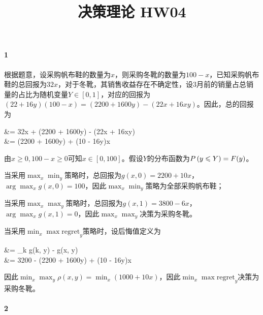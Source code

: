 \documentclass{../notes}
\title{决策理论 HW04}
\begin{document}
    \maketitle

    \paragraph*{1}

    根据题意，设采购帆布鞋的数量为$x$，则采购冬靴的数量为$100-x$，已知采购帆布鞋的总回报为$32x$，对于冬靴，其销售收益存在不确定性，设3月前的销量占总销量的占比为随机变量$Y\in [0, 1]$，对应的回报为$(22 + 16y)(100 - x) = (2200 + 1600y) - (22x + 16xy)$。因此，总的回报为

    \begin{derive}[g(x, y)]
        &= 32x + (2200 + 1600y) - (22x + 16xy) \\
        &= (2200 + 1600y) + (10 - 16y)x
    \end{derive}

    由$x \geq 0, 100-x\geq 0$可知$x\in [0, 100]$。假设$Y$的分布函数为$P\left(y\leqslant Y\right) = F(y)$。

    \begin{subquestions}
        \item 当采用$\max_x\min_y$策略时，总回报为$g(x, 0) = 2200+10x$，$\arg\max _x g(x, 0) = 100$，因此$\max_x\min_y$策略为全部采购帆布鞋；
        \item 当采用$\max_x\max_y$策略时，总回报为$g(x, 1) = 3800-6x$，$\arg\max _x g(x, 1) = 0$，因此$\max_x\max_y$决策为采购冬靴。
        \item 当采用$\min_x\max\text{regret}_y$策略时，设后悔值定义为

        \begin{derive}[\rho(x, y)]
            &= \max_k g(k, y) - g(x, y) \\
            &= 3200 - (2200 + 1600y) + (10 - 16y)x \\
        \end{derive}

        因此$\min_x\max_y \rho(x, y) = \min_x (1000 + 10x)$，因此$\min_x\max\text{regret}_y$决策为采购冬靴。
    \end{subquestions}

    \paragraph*{2}
\end{document}
